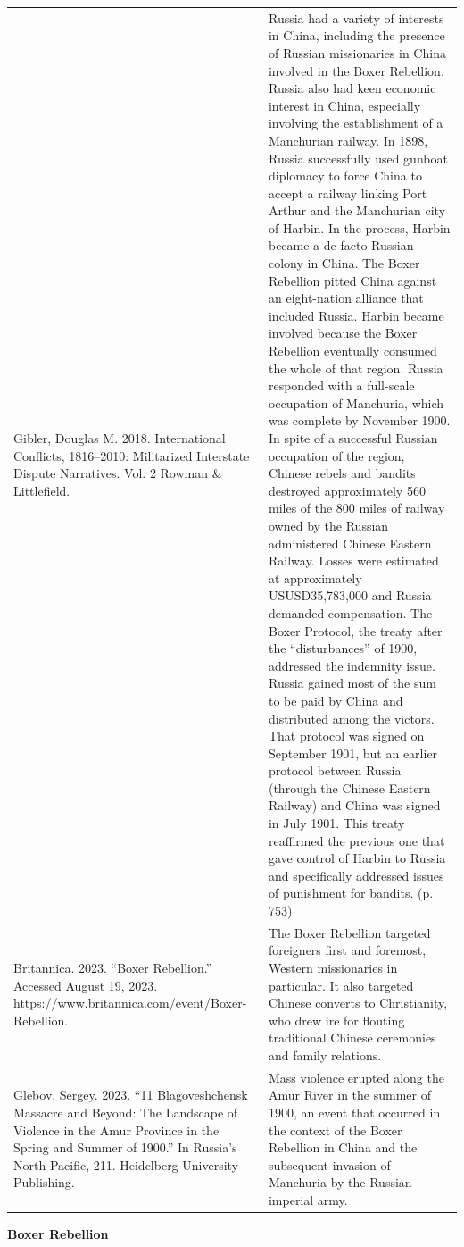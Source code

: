 {\begin{longtable}{p{}p{}}
Gibler, Douglas M. 2018. International Conflicts, 1816–2010: Militarized Interstate Dispute Narratives. Vol. 2 Rowman \& Littlefield. & Russia had a variety of interests in China, including the presence of Russian missionaries in China involved in the Boxer Rebellion. Russia also had keen economic interest in China, especially involving the establishment of a Manchurian railway. In 1898, Russia successfully used gunboat diplomacy to force China to accept a railway linking Port Arthur and the Manchurian city of Harbin. In the process, Harbin became a de facto Russian colony in China. The Boxer Rebellion pitted China against an eight-nation alliance that included Russia. Harbin became involved because the Boxer Rebellion eventually consumed the whole of that region. Russia responded with a full-scale occupation of Manchuria, which was complete by November 1900. In spite of a successful Russian occupation of the region, Chinese rebels and bandits destroyed approximately 560 miles of the 800 miles of railway owned by the Russian administered Chinese Eastern Railway. Losses were estimated at approximately USUSD35,783,000 and Russia demanded compensation. The Boxer Protocol, the treaty after the “disturbances” of 1900, addressed the indemnity issue. Russia gained most of the sum to be paid by China and distributed among the victors. That protocol was signed on September 1901, but an earlier protocol between Russia (through the Chinese Eastern Railway) and China was signed in July 1901. This treaty reaffirmed the previous one that gave control of Harbin to Russia and specifically addressed issues of punishment for bandits. (p. 753)
\\
Britannica. 2023. “Boxer Rebellion.” Accessed August 19, 2023. https://www.britannica.com/event/Boxer-Rebellion. & The Boxer Rebellion targeted foreigners first and foremost, Western missionaries in particular. It also targeted Chinese converts to Christianity, who drew ire for flouting traditional Chinese ceremonies and family relations.
\\
Glebov, Sergey. 2023. “11 Blagoveshchensk Massacre and Beyond: The Landscape of Violence in the Amur Province in the Spring and Summer of 1900.” In Russia's North Pacific, 211. Heidelberg University Publishing. & Mass violence erupted along the Amur River in the summer of 1900, an
event that occurred in the context of the Boxer Rebellion in China and
the subsequent invasion of Manchuria by the Russian imperial army.
\\
\end{longtable}}
\clearpage
         \textbf{Boxer Rebellion} 


